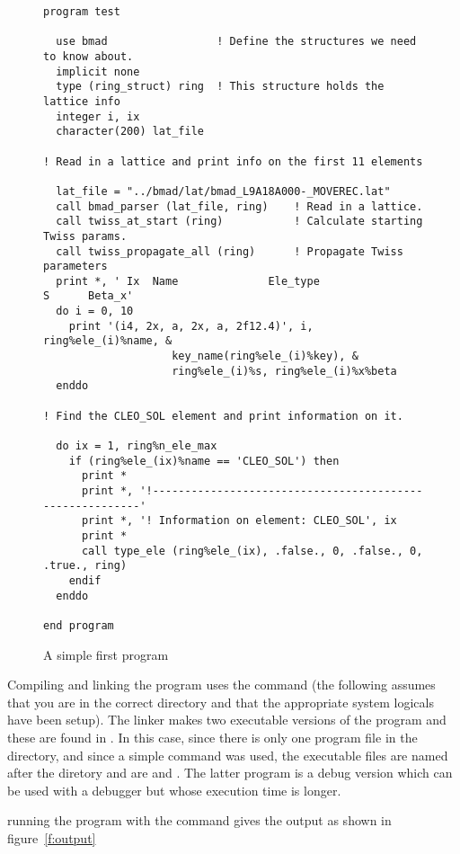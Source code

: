 \begin{figure}
\begin{verbatim}
program test

  use bmad                 ! Define the structures we need to know about.
  implicit none
  type (ring_struct) ring  ! This structure holds the lattice info
  integer i, ix
  character(200) lat_file

! Read in a lattice and print info on the first 11 elements

  lat_file = "../bmad/lat/bmad_L9A18A000-_MOVEREC.lat"
  call bmad_parser (lat_file, ring)    ! Read in a lattice.
  call twiss_at_start (ring)           ! Calculate starting Twiss params.
  call twiss_propagate_all (ring)      ! Propagate Twiss parameters
  print *, ' Ix  Name              Ele_type                   S      Beta_x'
  do i = 0, 10
    print '(i4, 2x, a, 2x, a, 2f12.4)', i, ring%ele_(i)%name, &
                    key_name(ring%ele_(i)%key), &
                    ring%ele_(i)%s, ring%ele_(i)%x%beta
  enddo

! Find the CLEO_SOL element and print information on it.

  do ix = 1, ring%n_ele_max
    if (ring%ele_(ix)%name == 'CLEO_SOL') then
      print *
      print *, '!---------------------------------------------------------'
      print *, '! Information on element: CLEO_SOL', ix
      print *
      call type_ele (ring%ele_(ix), .false., 0, .false., 0, .true., ring)
    endif
  enddo

end program
\end{verbatim}
\caption{A simple first program}
\label{f:program}
\end{figure}

Compiling and linking the program uses the  command (the
following assumes that you are in the correct directory and that the
appropriate system logicals have been setup). The linker makes two
executable versions of the program and these are found in .
In this case, since there is only one program file in the directory, and
since a simple  command was used, the executable files are
named after the diretory and are  and
. The latter program is a debug version
which can be used with a debugger but whose execution time is longer.

running the program with the command 
gives the output as shown in figure~\ref{f:output}

